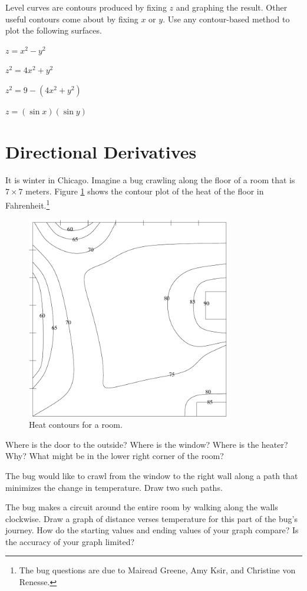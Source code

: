 \documentclass{problemset}
\begin{document}
	\question
	Level curves are contours produced by fixing $z$ and graphing the result.  Other useful contours
	come about by fixing $x$ or $y$.  Use any contour-based method to plot the following surfaces.
	\begin{parts}
		\item $z=x^2-y^2$
		\item $z^2=4x^2+y^2$
		\item $z^2=9-(4x^2+y^2)$
		\item $z=(\sin x)(\sin y)$
	\end{parts}

\newpage
\section*{Directional Derivatives}

	\question
	It is winter in Chicago.  Imagine a bug crawling along the floor of
	a room that is $7\times 7$ meters.  Figure \ref{heatcontour1} shows the contour plot of the heat
	of the floor in Fahrenheit.\footnote{The bug questions are due to Mairead Greene, Amy Ksir, and Christine von Renesse.}
	\begin{figure}[h!]
		\begin{center}
			\includegraphics[width=3.5in]{heat_contour1.pdf}
		\end{center}
		\vspace{-.5cm}
		\caption{Heat contours for a room.}
		\label{heatcontour1}
	\end{figure}
	\begin{parts}
		\item Where is the door to the outside?  Where is the window?  Where is the heater? Why?
			What might be in the lower right corner of the room?
		\item The bug would like to crawl from the window to the right wall along a path that minimizes
			the change in temperature.  Draw two such paths.
		\item The bug makes a circuit around the entire room by walking along the walls clockwise.
			Draw a graph of distance verses temperature for this part of the bug's journey.  How
			do the starting values and ending values of your graph compare?  Is the accuracy of your
			graph limited?
	\end{parts}
	
\end{document}
